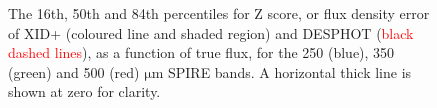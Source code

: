 \documentclass[useAMS,usenatbib]{mnras}
\begin{document}
\begin{figure}
\centering 
\caption{The 16th, 50th and 84th percentiles for Z score, or flux density error of \textsc{XID+} (coloured line and shaded region) and \textsc{DESPHOT}  (\textcolor{red}{black dashed lines}), as a function of true flux, for the 250 (blue), 350 (green) and 500 (red) $\mathrm{\mu m}$ SPIRE bands. A horizontal thick line is shown at zero for clarity.}\label{fig:zscore}
\end{figure}
\end{document}
